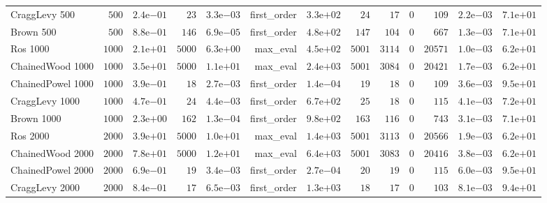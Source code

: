 \begin{longtable}[c]{lrrrrrrrrrrrr}
CraggLevy 500 & \(  500\) & \( 2.4\)e\(-01\) & \(   23\) & \( 3.3\)e\(-03\) & first\_order & \( 3.3\)e\(+02\) & \(   24\) & \(   17\) & \(    0\) & \(  109\) & \( 2.2\)e\(-03\) & \( 7.1\)e\(+01\) \\
Brown 500 & \(  500\) & \( 8.8\)e\(-01\) & \(  146\) & \( 6.9\)e\(-05\) & first\_order & \( 4.8\)e\(+02\) & \(  147\) & \(  104\) & \(    0\) & \(  667\) & \( 1.3\)e\(-03\) & \( 7.1\)e\(+01\) \\
Ros 1000 & \( 1000\) & \( 2.1\)e\(+01\) & \( 5000\) & \( 6.3\)e\(+00\) & max\_eval & \( 4.5\)e\(+02\) & \( 5001\) & \( 3114\) & \(    0\) & \(20571\) & \( 1.0\)e\(-03\) & \( 6.2\)e\(+01\) \\
ChainedWood 1000 & \( 1000\) & \( 3.5\)e\(+01\) & \( 5000\) & \( 1.1\)e\(+01\) & max\_eval & \( 2.4\)e\(+03\) & \( 5001\) & \( 3084\) & \(    0\) & \(20421\) & \( 1.7\)e\(-03\) & \( 6.2\)e\(+01\) \\
ChainedPowel 1000 & \( 1000\) & \( 3.9\)e\(-01\) & \(   18\) & \( 2.7\)e\(-03\) & first\_order & \( 1.4\)e\(-04\) & \(   19\) & \(   18\) & \(    0\) & \(  109\) & \( 3.6\)e\(-03\) & \( 9.5\)e\(+01\) \\
CraggLevy 1000 & \( 1000\) & \( 4.7\)e\(-01\) & \(   24\) & \( 4.4\)e\(-03\) & first\_order & \( 6.7\)e\(+02\) & \(   25\) & \(   18\) & \(    0\) & \(  115\) & \( 4.1\)e\(-03\) & \( 7.2\)e\(+01\) \\
Brown 1000 & \( 1000\) & \( 2.3\)e\(+00\) & \(  162\) & \( 1.3\)e\(-04\) & first\_order & \( 9.8\)e\(+02\) & \(  163\) & \(  116\) & \(    0\) & \(  743\) & \( 3.1\)e\(-03\) & \( 7.1\)e\(+01\) \\
Ros 2000 & \( 2000\) & \( 3.9\)e\(+01\) & \( 5000\) & \( 1.0\)e\(+01\) & max\_eval & \( 1.4\)e\(+03\) & \( 5001\) & \( 3113\) & \(    0\) & \(20566\) & \( 1.9\)e\(-03\) & \( 6.2\)e\(+01\) \\
ChainedWood 2000 & \( 2000\) & \( 7.8\)e\(+01\) & \( 5000\) & \( 1.2\)e\(+01\) & max\_eval & \( 6.4\)e\(+03\) & \( 5001\) & \( 3083\) & \(    0\) & \(20416\) & \( 3.8\)e\(-03\) & \( 6.2\)e\(+01\) \\
ChainedPowel 2000 & \( 2000\) & \( 6.9\)e\(-01\) & \(   19\) & \( 3.4\)e\(-03\) & first\_order & \( 2.7\)e\(-04\) & \(   20\) & \(   19\) & \(    0\) & \(  115\) & \( 6.0\)e\(-03\) & \( 9.5\)e\(+01\) \\
CraggLevy 2000 & \( 2000\) & \( 8.4\)e\(-01\) & \(   17\) & \( 6.5\)e\(-03\) & first\_order & \( 1.3\)e\(+03\) & \(   18\) & \(   17\) & \(    0\) & \(  103\) & \( 8.1\)e\(-03\) & \( 9.4\)e\(+01\) \\

\end{longtable}
